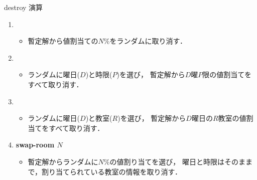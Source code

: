 \documentclass[11pt,dvipdfmx,handout]{beamer}
\begin{document}
\begin{frame}{destroy 演算}

  \begin{block}{}
    \begin{enumerate}
    \item {}
      \begin{itemize}
      \item 暫定解から値割当ての$N$\%をランダムに取り消す．
      \end{itemize}
    \item {}
      \begin{itemize}
      \item ランダムに曜日($D$)と時限($P$)を選び，
        暫定解から$D$曜$P$限の値割当てをすべて取り消す．
   \end{itemize}
  \item {}
   \begin{itemize}
   \item ランダムに曜日($D$)と教室($R$)を選び，
     暫定解から$D$曜日の$R$教室の値割当てをすべて取り消す．
   \end{itemize}
  \item \alert{\bf swap-room $N$}
   \begin{itemize}
    \item 暫定解からランダムに$N$\%の値割り当てを選び，
    曜日と時限はそのままで，割り当てられている教室の情報を取り消す．
   \end{itemize}
  \end{enumerate}
  \end{block}
 \end{frame}
\end{document}
